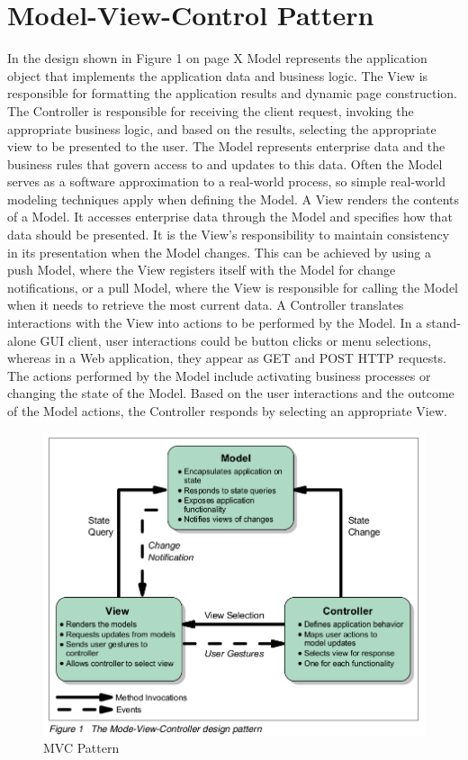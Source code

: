 \section{Model-View-Control Pattern}
In the design shown in Figure 1 on page X Model represents the application
object that implements the application data and business logic. The View is
responsible for formatting the application results and dynamic page construction.
The Controller is responsible for receiving the client request, invoking the
appropriate business logic, and based on the results, selecting the appropriate
view to be presented to the user.
The Model represents enterprise data and the business rules that govern
access to and updates to this data. Often the Model serves as a software
approximation to a real-world process, so simple real-world modeling
techniques apply when defining the Model.
A View renders the contents of a Model. It accesses enterprise data through
the Model and specifies how that data should be presented.
It is the View's responsibility to maintain consistency in its presentation when
the Model changes. This can be achieved by using a push Model, where the
View registers itself with the Model for change notifications, or a pull Model,
where the View is responsible for calling the Model when it needs to retrieve
the most current data.
A Controller translates interactions with the View into actions to be performed
by the Model. In a stand-alone GUI client, user interactions could be button
clicks or menu selections, whereas in a Web application, they appear as GET
and POST HTTP requests. The actions performed by the Model include
activating business processes or changing the state of the Model. Based on
the user interactions and the outcome of the Model actions, the Controller
responds by selecting an appropriate View.
\begin{figure}[!ht]
\centering
\includegraphics[scale=0.7]{images/MVCPattern.png}   
\caption[MVC Pattern]{MVC Pattern}
\label{img:MVCPattern}                           
\end{figure}
